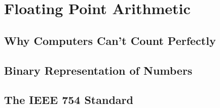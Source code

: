 \chapter{Floating Point Arithmetic}

\section{Why Computers Can't Count Perfectly}

\section{Binary Representation of Numbers}


\section{The IEEE 754 Standard}


